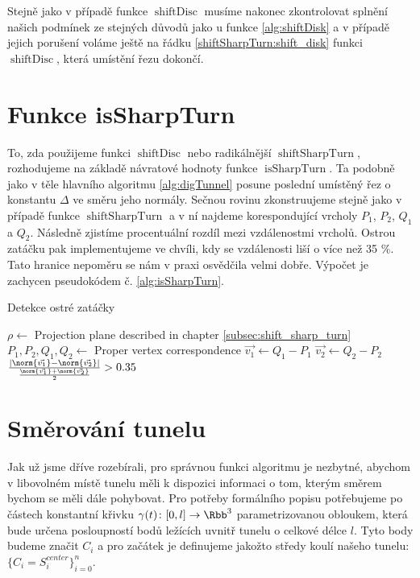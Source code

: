 Stejně jako v případě funkce $ \operatorname{shiftDisc} $ musíme nakonec
zkontrolovat splnění našich podmínek ze stejných důvodů jako u funkce
\ref{alg:shiftDisk} a v případě jejich porušení voláme ještě
na řádku \ref{shiftSharpTurn:shift_disk} funkci $ \operatorname{shiftDisc} $,
která umístění řezu dokončí.





\section{Funkce isSharpTurn} \label{subsec:is_sharp_turn}
To, zda použijeme funkci $ \operatorname{shiftDisc} $ nebo radikálnější
$ \operatorname{shiftSharpTurn} $, rozhodujeme na základě návratové hodnoty
funkce $ \operatorname{isSharpTurn} $. Ta podobně jako v těle hlavního
algoritmu \ref{alg:digTunnel} posune poslední umístěný řez o konstantu
$ \Delta $ ve směru jeho normály. Sečnou rovinu zkonstruujeme stejně jako v
případě funkce $ \operatorname{shiftSharpTurn} $ a v ní najdeme korespondující
vrcholy $ P_1$, $P_2$, $Q_1$ a $ Q_2 $. Následně zjistíme procentuální rozdíl
mezi vzdálenostmi vrcholů. Ostrou zatáčku pak implementujeme ve chvíli, kdy se
vzdálenosti liší o více než 35 \%. Tato hranice nepoměru se nám v praxi osvědčila
velmi dobře. Výpočet je zachycen pseudokódem č. \ref{alg:isSharpTurn}.

\begin{algorithm}
\caption{Detekce ostré zatáčky}
\label{alg:isSharpTurn}
\begin{algorithmic}[1]

    \State $ \rho \gets $ Projection plane described in chapter \ref{subsec:shift_sharp_turn}
    \State $ P_1, P_2, Q_1, Q_2 \gets $ Proper vertex correspondence
    \State $ \vec{v_1} \gets Q_1 - P_1 $
    \State $ \vec{v_2} \gets Q_2 - P_2 $
    \State \Return $ \frac{\left| \norm{\vec{v_1}} - \norm{\vec{v_2}} \right|}
                          {\frac{\norm{\vec{v_1}} + \norm{\vec{v_2}}}{2}} > 0.35$
\EndFunction

\end{algorithmic}
\end{algorithm}





\section{Směrování tunelu} \label{subsec:tunnel_dir}
Jak už jsme dříve rozebírali, pro správnou funkci algoritmu je nezbytné, abychom
v libovolném místě tunelu měli k dispozici informaci o tom, kterým směrem bychom
se měli dále pohybovat. Pro potřeby formálního popisu potřebujeme
po částech konstantní křivku $ \gamma(t) \colon [0, l] \to \Rbb^3$
parametrizovanou obloukem, která bude
určena posloupností bodů ležících uvnitř tunelu o celkové délce $ l $. Tyto body
budeme značit $ C_i $ a pro začátek je definujeme jakožto středy koulí našeho tunelu:
$ \{C_i = S_i^{center}\}_{i=0}^{n} $.

